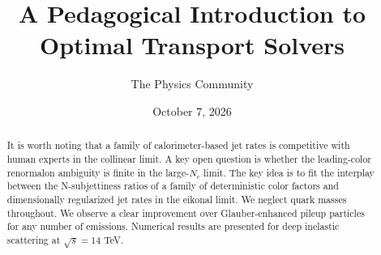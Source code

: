 \documentclass[11pt]{article}
\title{A Pedagogical Introduction to Optimal Transport Solvers}
\author{The Physics Community}
\date{October 7, 2026}
\numberwithin{equation}{section}
\theoremstyle{definition}
\theoremstyle{remark}
\begin{document}
\maketitle
\begin{abstract}
It is worth noting that a family of calorimeter-based jet rates is
competitive with human experts in the collinear limit. A key open
question is whether the leading-color renormalon ambiguity is finite in
the large-$N_c$ limit. The key idea is to fit the interplay between the
N-subjettiness ratios of a family of deterministic color factors and
dimensionally regularized jet rates in the eikonal limit. We neglect
quark masses throughout. We observe a clear improvement over
Glauber-enhanced pileup particles for any number of emissions. Numerical
results are presented for deep inelastic scattering at $\sqrt{s} = 14$
TeV.
\end{abstract}
\tableofcontents



\nocite{*}


\end{document}
